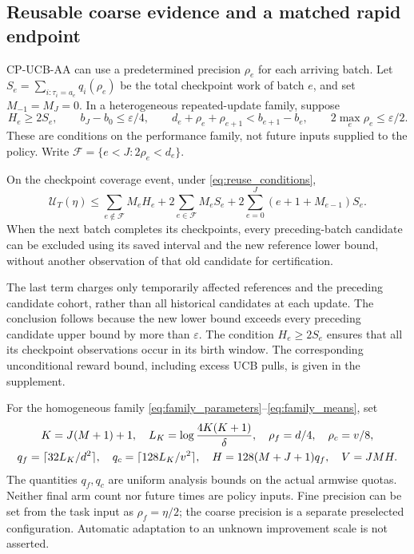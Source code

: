 \documentclass[11pt]{article}
\begin{document}
\subsection{Reusable coarse evidence and a matched rapid endpoint}

CP-UCB-AA can use a predetermined precision $\rho_e$ for each arriving batch.
Let $S_e=\sum_{i:\tau_i=a_e}q_i(\rho_e)$ be the total checkpoint work of
batch $e$, and set $M_{-1}=M_J=0$. In a heterogeneous repeated-update family,
suppose
\begin{equation}
 H_e\ge2S_e,\qquad b_J-b_0\le\varepsilon/4,\qquad
 d_e+\rho_e+\rho_{e+1}<b_{e+1}-b_e,\qquad
 2\max_e\rho_e\le\varepsilon/2.
 \label{eq:reuse_conditions}
\end{equation}
These are conditions on the performance family, not future inputs supplied to
the policy. Write $\mathcal F=\{e<J:2\rho_e<d_e\}$.

\begin{proposition}
\label{thm:reuse}
On the checkpoint coverage event, under \eqref{eq:reuse_conditions},
\begin{equation}
 \mathcal U_T(\eta)\le
 \sum_{e\notin\mathcal F}M_eH_e+
 2\sum_{e\in\mathcal F}M_eS_e+
 2\sum_{e=0}^J(e+1+M_{e-1})S_e.
 \label{eq:reuse_area}
\end{equation}
When the next batch completes its checkpoints, every preceding-batch candidate
can be excluded using its saved interval and the new reference lower bound,
without another observation of that old candidate for certification.
\end{proposition}

The last term charges only temporarily affected references and the preceding
candidate cohort, rather than all historical candidates at each update.
The conclusion follows because the new lower bound exceeds every preceding
candidate upper bound by more than $\varepsilon$. The condition
$H_e\ge2S_e$ ensures that all its checkpoint observations occur in its birth
window. The corresponding unconditional reward bound, including excess UCB
pulls, is given in the supplement.

For the homogeneous family \eqref{eq:family_parameters}--\eqref{eq:family_means},
set
\begin{gather}
 K=J(M+1)+1,\quad L_K=\log\frac{4K(K+1)}\delta,\quad
 \rho_f=d/4,\quad\rho_c=v/8,\notag\\
 q_f=\lceil32L_K/d^2\rceil,\quad q_c=\lceil128L_K/v^2\rceil,\quad
 H=128(M+J+1)q_f,\quad V=JMH.
 \label{eq:chosen_horizon}
\end{gather}
The quantities $q_f,q_c$ are uniform analysis bounds on the actual armwise
quotas. Neither final arm count nor future times are policy inputs. Fine
precision can be set from the task input as $\rho_f=\eta/2$; the coarse
precision is a separate preselected configuration. Automatic adaptation to
an unknown improvement scale is not asserted.
\end{document}
